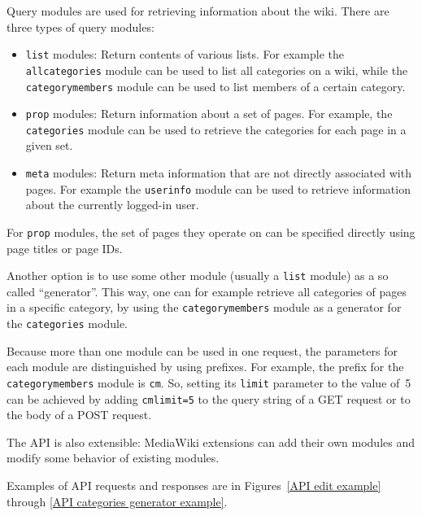 Query modules are used for retrieving information about the wiki. There are three types of query modules:

\begin{itemize}
\item \texttt{list} modules: Return contents of various lists.
For example the \texttt{all\-categories} module can be used to list all categories on a wiki,
while the \texttt{categorymembers} module can be used to list members of a certain category.
\item \texttt{prop} modules: Return information about a set of pages.
For example, the \texttt{categories} module can be used to retrieve the categories for each page in a given set.
\item \texttt{meta} modules: Return meta information that are not directly associated with pages.
For example the \texttt{userinfo} module can be used to retrieve information about the currently logged-in user.
\end{itemize}

For \texttt{prop} modules, the set of pages they operate on can be specified directly using page titles or page IDs.

Another option is to use some other module (usually a \texttt{list} module) as a so called “generator”.
This way, one can for example retrieve all categories of pages in a specific category,
by using the \texttt{categorymembers} module as a generator for the \texttt{categories} module.

Because more than one module can be used in one request,
the parameters for each module are distinguished by using prefixes.
For example, the prefix for the \texttt{categorymembers} module is \texttt{cm}.
So, setting its \texttt{limit} parameter to the value of~5 can be achieved by
adding \texttt{cmlimit=5} to the query string of a GET request or to the body of a POST request.

The \ac{API} is also extensible: MediaWiki extensions can add their own modules and modify some behavior of existing modules.

Examples of \ac{API} requests and responses are
in Figures~\ref{API edit example} through \ref{API categories generator example}.

